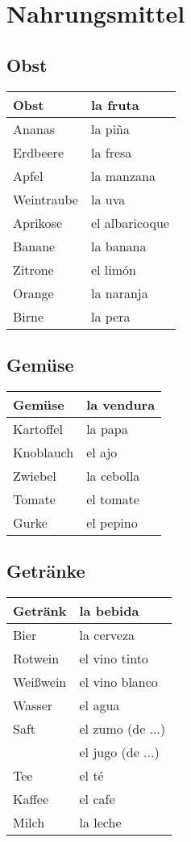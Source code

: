 \documentclass{spanish_summary}
\begin{document}
\chapter*{Nahrungsmittel}

\section*{Obst}
\begin{longtable}{p{} | p{}} 
\textbf{Obst}     & \textbf{la fruta}                                  \\ \hline
\hline
\endhead %
Ananas & la pi\~{n}a \\
Erdbeere & la fresa \\
Apfel & la manzana \\
Weintraube & la uva \\
Aprikose & el albaricoque \\
Banane & la banana \\
Zitrone & el limón\\
Orange & la naranja \\
Birne & la pera \\
\end{longtable}


\section*{Gemüse}
\begin{longtable}{p{} | p{}} 
\textbf{Gemüse}     & \textbf{la vendura}                                       \\ \hline
\hline
\endhead %
Kartoffel & la papa\\
Knoblauch & el ajo\\
Zwiebel & la cebolla\\
Tomate & el tomate\\
Gurke & el pepino\\
\end{longtable}


\section*{Getränke}
\begin{longtable}{p{} | p{}} 
\textbf{Getränk}     & \textbf{la bebida}                                       \\ \hline
\hline
\endhead %
  Bier & la cerveza\\
  Rotwein & el vino tinto\\
  Weißwein & el vino blanco\\
  Wasser & el agua \\
  Saft & el zumo (de ...)\\
  & el jugo (de ...) \\
  Tee & el té \\
  Kaffee & el cafe \\
  Milch & la leche \\
\end{longtable}
\end{document}
